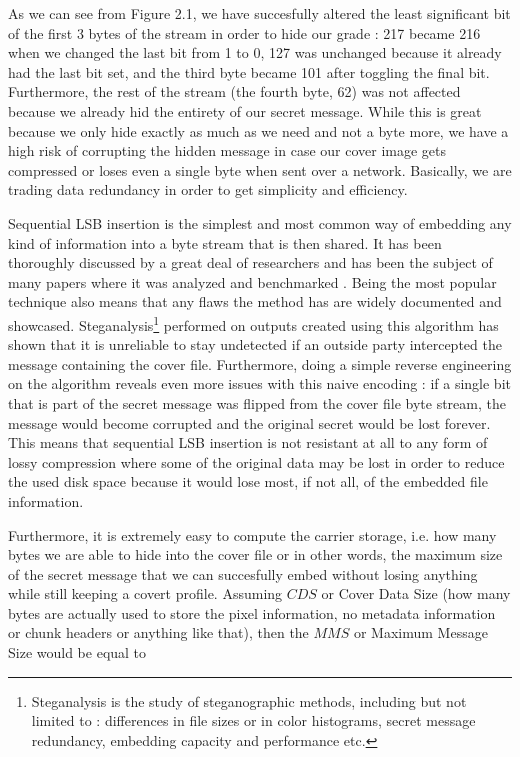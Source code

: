 \begin{multicols*}{2}
As we can see from Figure 2.1, we have succesfully altered the least significant bit of the first 3 bytes of the stream in order to hide our grade : 217 became 216 when we changed the last bit from 1 to 0, 127 was unchanged because it already had the last bit set, and the third byte became 101 after toggling the final bit. Furthermore, the rest of the stream (the fourth byte, 62) was not affected because we already hid the entirety of our secret message. While this is great because we only hide exactly as much as we need and not a byte more, we have a high risk of corrupting the hidden message in case our cover image gets compressed or loses even a single byte when sent over a network. Basically, we are trading data redundancy in order to get simplicity and efficiency.

Sequential LSB insertion is the simplest and most common way of embedding any kind of information into a byte stream that is then shared. It has been thoroughly discussed by a great deal of researchers and has been the subject of many papers where it was analyzed and benchmarked\cite{seeing-the-unseen}\cite{hide-and-seek} . Being the most popular technique also means that any flaws the method has are widely documented and showcased. Steganalysis\footnote{Steganalysis is the study of steganographic methods, including but not limited to : differences in file sizes or in color histograms, secret message redundancy, embedding capacity and performance etc.} performed on outputs created using this algorithm has shown that it is unreliable to stay undetected if an outside party intercepted the message containing the cover file\cite{attack-on-steganography}. Furthermore, doing a simple reverse engineering on the algorithm reveals even more issues with this naive encoding : if a single bit that is part of the secret message was flipped from the cover file byte stream, the message would become corrupted and the original secret would be lost forever. This means that sequential LSB insertion is not resistant at all to any form of lossy compression where some of the original data may be lost in order to reduce the used disk space because it would lose most, if not all, of the embedded file information. 

Furthermore, it is extremely easy to compute the carrier storage, i.e. how many bytes we are able to hide into the cover file or in other words, the maximum size of the secret message that we can succesfully embed without losing anything while still keeping a covert profile. Assuming $CDS$ or Cover Data Size (how many bytes are actually used to store the pixel information, no metadata information or chunk headers or anything like that), then the $MMS$ or Maximum Message Size would be equal to


\end{multicols*}
